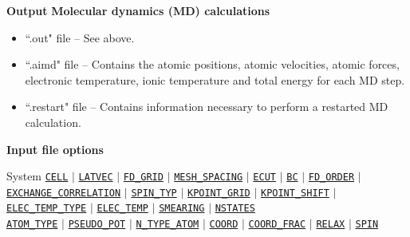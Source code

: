 \documentclass[xcolor=dvipsnames,t]{beamer}
\begin{document}
\begin{frame}{\textbf{Output}}
\textbf{Molecular dynamics (MD) calculations}  \\
\begin{itemize}
  \item ``.out" file -- See above.
  \item ``.aimd" file -- Contains the atomic positions, atomic velocities, atomic forces, electronic temperature, ionic temperature and total energy for each MD step.
  \item ``.restart" file -- Contains information necessary to perform a restarted MD calculation. 
\end{itemize}

\end{frame}


\begin{frame}[allowframebreaks]{\textbf{Input file options}} \label{Index}
\vspace{-2mm}
\begin{block}{System}
\hyperlink{CELL}{\texttt{CELL}} $\vert$ \hyperlink{LATVEC}{\texttt{LATVEC}}  $\vert$ \hyperlink{FD_GRID}{\texttt{FD\_GRID}} $\vert$ \hyperlink{MESH_SPACING}{\texttt{MESH\_SPACING}} $\vert$ \hyperlink{ECUT}{\texttt{ECUT}} $\vert$ \hyperlink{BC}{\texttt{BC}} $\vert$ \hyperlink{FD_ORDER}{\texttt{FD\_ORDER}} $\vert$ \hyperlink{EXCHANGE_CORRELATION}{\texttt{EXCHANGE\_CORRELATION}} $\vert$ \hyperlink{SPIN_TYP}{\texttt{SPIN\_TYP}} $\vert$ \hyperlink{KPOINT_GRID}{\texttt{KPOINT\_GRID}} $\vert$ \hyperlink{KPOINT_SHIFT}{\texttt{KPOINT\_SHIFT}} $\vert$ \hyperlink{ELEC_TEMP_TYPE}{\texttt{ELEC\_TEMP\_TYPE}} $\vert$ \hyperlink{ELEC_TEMP}{\texttt{ELEC\_TEMP}} $\vert$ \hyperlink{SMEARING}{\texttt{SMEARING}} $\vert$ \hyperlink{NSTATES}{\texttt{NSTATES}} \\
\hyperlink{ATOM_TYPE}{\texttt{ATOM\_TYPE}} $\vert$ \hyperlink{PSEUDO_POT}{\texttt{PSEUDO\_POT}}  $\vert$ \hyperlink{N_TYPE_ATOM}{\texttt{N\_TYPE\_ATOM}} $\vert$ \hyperlink{COORD}{\texttt{COORD}} $\vert$ \hyperlink{COORD_FRAC}{\texttt{COORD\_FRAC}} $\vert$ \hyperlink{RELAX}{\texttt{RELAX}} $\vert$ \hyperlink{SPIN}{\texttt{SPIN}} 
\end{block}


\end{frame}
\end{document}
